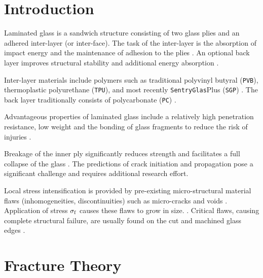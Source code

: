 \documentclass[format=acmtog, 12pt, screen=true, review=false]{acmart}
\begin{document}
\maketitle

\section{Introduction}

Laminated glass is a sandwich structure consisting of two glass plies and an adhered inter-layer (or inter-face). The task of the inter-layer is the absorption of impact energy and the maintenance of adhesion to the plies \cite{Wu14}. An optional back layer improves structural stability and additional energy absorption \cite{Bio10, Bra10}.

\bigbreak
Inter-layer materials include polymers such as traditional polyvinyl butyral (\texttt{PVB}), thermoplastic polyurethane (\texttt{TPU}), and most recently \texttt{SentryGlas}\textregistered Plus (\texttt{SGP}) \cite{Moh18, Wan18}. The back layer traditionally consists of polycarbonate (\texttt{PC}) \cite{Mon04, Bra10}.

\bigbreak
Advantageous properties of laminated glass include a relatively high penetration resistance, low weight \cite{Wu14} and the bonding of glass fragments to reduce the risk of injuries \cite{Che17, Flo98, Ji98}. 

\bigbreak
Breakage of the inner ply significantly reduces strength and facilitates a full collapse of the glass \cite{Flo98}. The predictions of crack initiation and propagation pose a significant challenge and requires additional research effort.

\bigbreak
Local stress intensification is provided by pre-existing micro-structural material flaws (inhomogeneities, discontinuities) such as micro-cracks and voids \cite{Sch12}. Application of stress $\sigma_{\rm{f}}$ causes these flaws to grow in size. \cite{Flo98, Pel16}. Critical flaws, causing complete structural failure, are usually found on the cut and machined glass edges \cite{Pel16}.

\section{Fracture Theory}
\end{document}
